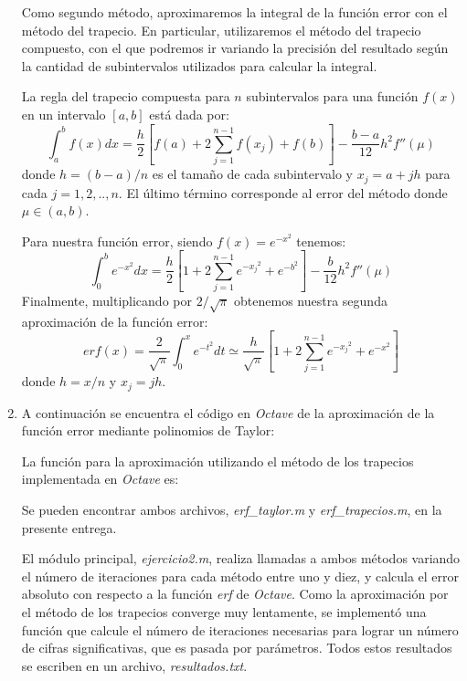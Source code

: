 \documentclass[titlepage,a4paper]{article}
\begin{document}
\begin{enumerate}[label=(\alph*)]
			Como segundo método, aproximaremos la integral de la función error con el método del trapecio\cite{burden1}. 
			En particular, utilizaremos el método del trapecio compuesto\cite{burden2}, con el que podremos ir variando 
			la precisión del resultado según la cantidad de subintervalos utilizados para calcular la integral.

			La regla del trapecio compuesta para $n$ subintervalos para una función $f(x)$ en un intervalo $[a,b]$ está dada por:
				\begin{equation}
					\int_{a}^{b}f(x)dx = \frac{h}{2}\left[f(a) + 2\sum_{j=1}^{n-1}f(x_{j})+f(b)\right]-\frac{b-a}{12}h^{2}f''(\mu)\label{eq:12}
				\end{equation}
			donde $h=(b-a)/n$ es el tamaño de cada subintervalo y $x_j = a + jh$ para cada $j=1,2,..,n$. El último 
			término corresponde al error del método donde $\mu \in (a,b)$.

			Para nuestra función error, siendo $f(x) = e^{-x^2}$ tenemos:
				\begin{equation}
					\int_{0}^{b}e^{-x^2}dx = \frac{h}{2}\left[1 + 2\sum_{j=1}^{n-1}e^{-{x_j}^2}+e^{-b^2}\right]-\frac{b}{12}h^{2}f''(\mu)
				\end{equation}
			Finalmente, multiplicando por $2/\sqrt{\pi}$ obtenemos nuestra segunda aproximación de la función error:
				\begin{equation}
					erf(x) = \frac{2}{\sqrt{\pi}}\int_{0}^{x}e^{-t^2}dt \simeq \frac{h}{\sqrt{\pi}}\left[1 + 2\sum_{j=1}^{n-1}e^{-{x_j}^2}+e^{-x^2}\right]
				\end{equation}
			donde $h = x/n$ y $x_j = jh$.
		
		\item
			A continuación se encuentra el código en \emph{Octave} de la aproximación de la función error mediante polinomios de Taylor:
			
			
			La función para la aproximación utilizando el método de los trapecios implementada en \emph{Octave} es:
			

			Se pueden encontrar ambos archivos, \textit{erf\_taylor.m} y \textit{erf\_trapecios.m}, en la presente entrega.

			El módulo principal, \textit{ejercicio2.m}, realiza llamadas a ambos métodos variando el número de iteraciones para 
			cada método entre uno y diez, y calcula el error absoluto con respecto a la función \emph{erf} de \emph{Octave}.
			Como la aproximación por el método de los trapecios converge muy lentamente, se implementó una función que calcule el número 
			de iteraciones necesarias para lograr un número de cifras significativas, que es pasada por parámetros.
			Todos estos resultados se escriben en un archivo, \emph{resultados.txt}.
			
		

\end{enumerate}
\end{document}
